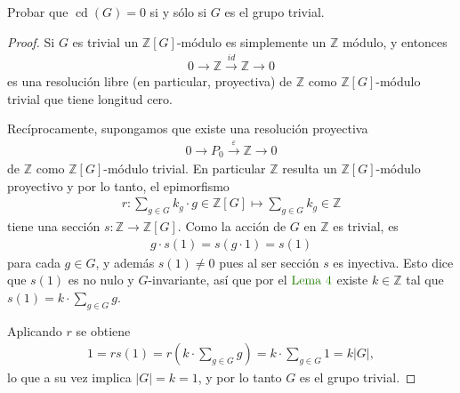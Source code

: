 \documentclass[11pt]{article}
\newcommand{\Z}{\mathbb{Z}}
\newcommand{\eps}{\varepsilon}
\newcommand{\paint}[1]{\color{color}{#1}}
\newenvironment{exercise}[2][Ejercicio]{\begin{trivlist}
\item[\hskip \labelsep \paint{{\bfseries #1}}\hskip \labelsep {\bfseries #2.}]}{\end{trivlist}}
\begin{document}
\begin{exercise}{5} Probar que $\operatorname{cd}(G) = 0$ si y sólo si $G$ es el grupo trivial.
\end{exercise}
\begin{proof} Si $G$ es trivial un $\Z[G]$-módulo es simplemente un $\Z$ módulo, y entonces
\begin{align*}
0 \to \Z \xrightarrow{id} \Z \to 0
\end{align*} 
es una resolución libre (en particular, proyectiva) de $\Z$ como $\Z[G]$-módulo trivial que tiene longitud cero. 

Recíprocamente, supongamos que existe una resolución proyectiva
\begin{align*}
0 \to P_0 \xrightarrow{\eps} \Z \to 0
\end{align*}
de $\Z$ como $\Z[G]$-módulo trivial. En particular $\Z$ resulta un $\Z[G]$-módulo proyectivo y por lo tanto, el epimorfismo
\begin{align*}
r : \sum_{g \in G}k_g \cdot g  \in \Z[G] \mapsto \sum_{g\in G}k_g \in \Z
\end{align*}
tiene una sección $s : \Z \to \Z[G]$. Como la acción de $G$ en $\Z$ es trivial, es
\begin{align*}
g \cdot s(1) = s(g \cdot 1) = s(1)
\end{align*}
para cada $g \in G$, y además $s(1) \neq 0$ pues al ser sección $s$ es inyectiva. Esto dice que $s(1)$ es no nulo y $G$-invariante, así que por el $\paint{\text{Lema $4$}}$ existe $k \in\Z$ tal que $s(1) = k \cdot \sum_{g \in G}g$. 

Aplicando $r$ se obtiene
\begin{align*}
1 = rs(1) = r\left(k \cdot \sum_{g \in G}g\right) = k \cdot \sum_{g \in G}1 = k |G|,
\end{align*}
lo que a su vez implica $|G| = k = 1$, y por lo tanto $G$ es el grupo trivial.
\end{proof}
\end{document}
